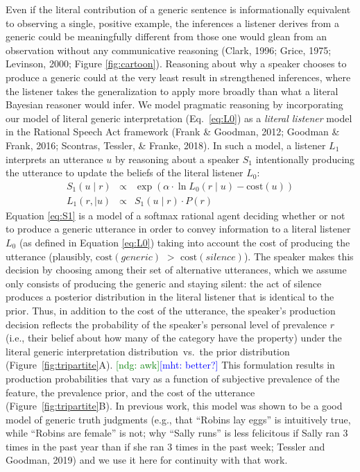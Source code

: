 \documentclass[floatsintext,doc]{apa6}
\newcommand{\mht}[1]{{\textcolor{Blue}{[mht: #1]}}}
\newcommand{\ndg}[1]{{\textcolor{Green}{[ndg: #1]}}}
\begin{document}
Even if the literal contribution of a generic sentence is informationally equivalent to observing a single, positive example, the inferences a listener derives from a generic could be meaningfully different from those one would glean from an observation without any communicative reasoning  (Clark, 1996; Grice, 1975; Levinson, 2000; Figure \ref{fig:cartoon}).
Reasoning about why a speaker chooses to produce a generic could at the very least result in strengthened inferences, where the listener takes the generalization to apply more broadly than what a literal Bayesian reasoner would infer. 
We model pragmatic reasoning by incorporating our model of literal generic interpretation (Eq.~\ref{eq:L0}) as a \emph{literal listener} model in the Rational Speech Act framework (Frank \& Goodman, 2012; Goodman \& Frank, 2016; Scontras, Tessler, \& Franke, 2018).
In such a model, a listener \(L_1\) interprets an utterance $u$ by reasoning about a speaker \(S_1\) intentionally producing the utterance to update the beliefs of the literal listener \(L_0\):
\begin{eqnarray}
S_1(u \mid r) &\propto& \exp{(\alpha \cdot \ln L_0(r \mid u) - \text{cost}(u))} \label{eq:S1} \\
L_1(r, \mid u) &\propto& S_1(u \mid r) \cdot P(r) \label{eq:L1}
\end{eqnarray}
Equation \ref{eq:S1} is a model of a softmax rational agent deciding whether or not to produce a generic utterance in order to convey information to a literal listener $L_0$  (as defined in Equation \ref{eq:L0}) taking into account the cost of producing the utterance (plausibly, \(\text{cost}(generic)\) \(>\) \(\text{cost}(silence)\)).
The speaker makes this decision by choosing among their set of alternative utterances, which we assume only consists of producing the generic and staying silent: the act of silence produces a posterior distribution in the literal listener that is identical to the prior.
Thus, in addition to the cost of the utterance, the speaker's production decision reflects the probability of the speaker's personal level of prevalence $r$ (i.e., their belief about how many of the category have the property) under the literal generic interpretation distribution~vs.~the prior distribution (Figure~\ref{fig:tripartite}A). \ndg{awk}\mht{better?}
This formulation results in production probabilities that vary as a function of subjective prevalence of the feature, the prevalence prior, and the cost of the utterance (Figure~\ref{fig:tripartite}B).
In previous work, this model was shown to be a good model of generic truth judgments (e.g., that ``Robins lay eggs'' is intuitively true, while ``Robins are female'' is not; why ``Sally runs'' is less felicitous if Sally ran 3 times in the past year than if she ran 3 times in the past week; Tessler and Goodman, 2019) and we use it here for continuity with that work. 
\end{document}
